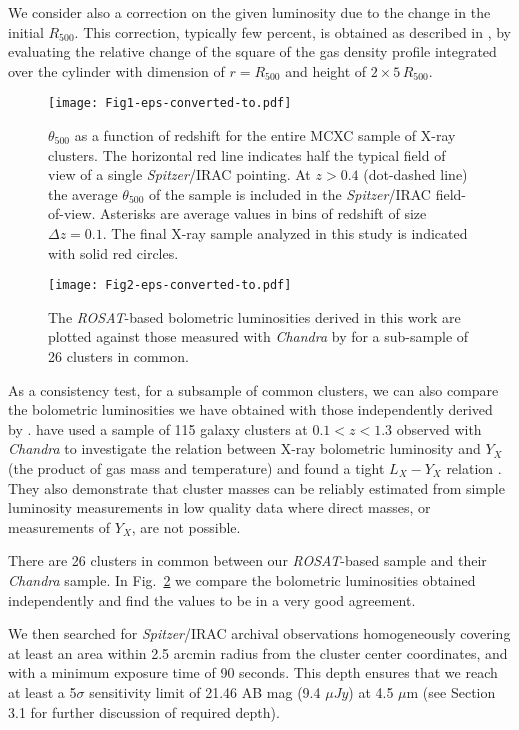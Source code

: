 \documentclass[apj,twocolumn]{emulateapj}
\begin{document}
{We consider also a correction on the given luminosity due to the change in the initial $R_{500}$. 
This correction, typically few percent, is obtained as described in \cite{Piffaretti11}, by evaluating the relative change of the square of the gas density profile integrated over the cylinder with dimension of $r=R_{500}$ and height of $2 \times 5 \, R_{500}$.

\begin{figure}[htb]
\texttt{[image: Fig1-eps-converted-to.pdf]}
\caption{$\theta_{500}$ as a function of redshift for the entire MCXC sample of X-ray clusters. The horizontal red line indicates half the typical field of view of a single {\it Spitzer}/IRAC pointing. At $z>0.4$ (dot-dashed line) the average $\theta_{500}$ of the sample is included in the {\it Spitzer}/IRAC field-of-view. Asterisks are average values in bins of redshift of size $\Delta z =0.1$. The final X-ray sample analyzed in this study is indicated with solid red circles.
}
\label{theta500}
\end{figure}

\begin{figure}[htb]
\texttt{[image: Fig2-eps-converted-to.pdf]}
\caption{The {\it ROSAT}-based bolometric luminosities derived in this work are plotted against those measured with {\it Chandra} by \citet{Maughan12} for a sub-sample of 26 clusters in common.}
\label{Maughan}
\end{figure}

As a consistency test, for a subsample of common clusters, we can also compare the bolometric luminosities we have obtained with those independently derived by  \citet{Maughan12}.
\citet{Maughan12} have used a sample of 115 galaxy clusters at $0.1<z<1.3$ observed with {\it Chandra} to investigate the relation between X-ray bolometric luminosity and $Y_X$ (the product of gas mass and temperature) and found a tight $L_X-Y_X$ relation  \citep{Maughan07}. They also demonstrate that cluster masses can be reliably estimated from simple luminosity measurements in low quality data where direct masses, or measurements of $Y_X$, are not possible.

There are 26 clusters  in common between our  {\it ROSAT}-based sample and their {\it Chandra} sample. In Fig.~\ref{Maughan} we compare the bolometric luminosities obtained independently and find the values to be in a very good agreement.

We then searched for {\it Spitzer}/IRAC archival observations  homogeneously covering at least an area within 2.5 arcmin radius from the cluster center coordinates, and with a minimum exposure time of 90 seconds. This depth ensures that we reach at least a 5$\sigma$ sensitivity limit of 21.46 AB mag (9.4 $\mu Jy$) at 4.5 $\mu$m (see Section 3.1 for further discussion of required depth). 

}
\end{document}
